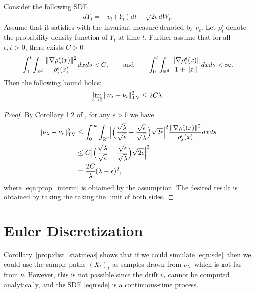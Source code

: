 \begin{prop}
\label{prop:dist_statmeas}
Consider the following SDE
\begin{align}
d Y_t = - v_t(Y_t) dt + \sqrt{2 \epsilon } d W_t. \label{eqn:sde_eps}
\end{align}
Assume that it satisfies  with the invariant measure denoted by $\nu_\epsilon$. Let $\rho^\epsilon_t$ denote the probability density function of $Y_t$ at time $t$. Further assume that for all $\epsilon,t>0$, there exists $C >0$  
\begin{align}
\int_{0}^t \int_{\mathbb{R}^d} \frac{\|\nabla \rho^\epsilon_s(x) \|^2}{\rho^\epsilon_s(x)} dx ds <C, \qquad \text{and} \qquad \int_{0}^t \int_{\mathbb{R}^d}  \frac{\|\nabla \rho^\epsilon_s(x)\|}{1+\|x\|} dx ds <\infty.
\end{align}
Then the following bound holds:
\begin{align}
\lim_{\epsilon \rightarrow 0} \| \nu_\lambda - \nu_\epsilon \|_{\textnormal{TV}}^2 \leq 2 C \lambda.
\end{align}
\end{prop}
%
\begin{proof}
By Corollary 1.2 of \cite{bogachev2016distances}, for any $\epsilon > 0$ we have 
\begin{align}
\| \nu_\lambda - \nu_\epsilon \|_{\textnormal{TV}}^2 &\leq \int_0^\infty \int_{\mathbb{R}^d} \Bigl| \Bigl(\frac{\sqrt{\lambda}}{\sqrt{\epsilon}}- \frac{\sqrt{\epsilon}}{\sqrt{\lambda}} \Bigr) \sqrt{2\epsilon}  \Bigr|^2 \frac{\|\nabla \rho^\epsilon_s(x)\|^2}{\rho^\epsilon_s(x)}  dx ds \\
&\leq  C \Bigl| \Bigl(\frac{\sqrt{\lambda}}{\sqrt{\epsilon}}- \frac{\sqrt{\epsilon}}{\sqrt{\lambda}} \Bigr) \sqrt{2\epsilon}  \Bigr|^2 \label{eqn:prop_interm} \\
&= \frac{2C}{\lambda} (\lambda - \epsilon)^2,
\end{align}
where \eqref{eqn:prop_interm} is obtained by the assumption. The desired result is obtained by taking the taking the limit of both sides. 
\end{proof}
%



\section{Euler Discretization}


Corollary~\ref{prop:dist_statmeas} shows that if we could simulate \eqref{eqn:sde}, then we could use the sample paths $(X_t)_t$ as
samples drawn from $\nu_\lambda$, which is not far from $\nu$. However, this is not possible since the drift $v_t$ cannot be computed analytically, and the SDE \eqref{eqn:sde} is a continuous-time process.

